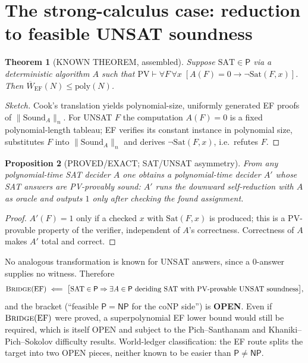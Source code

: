 \documentclass[11pt]{article}
\newtheorem{theorem}{Theorem}
\newtheorem{proposition}[theorem]{Proposition}
\newcommand{\SAT}{\mathrm{SAT}}
\newcommand{\Pclass}{\mathsf{P}}
\newcommand{\NP}{\mathsf{NP}}
\begin{document}
\section{The strong-calculus case: reduction to feasible UNSAT soundness}
\begin{theorem}[KNOWN THEOREM, assembled]\label{thm:ef}
Suppose $\SAT\in\Pclass$ via a deterministic algorithm $A$ such that
$\mathrm{PV}\vdash\forall F\,\forall x\;[A(F)=0\rightarrow\neg\mathrm{Sat}(F,x)]$.
Then $\overline W_{\mathrm{EF}}(N)\le\mathrm{poly}(N)$.
\end{theorem}
\begin{proof}[Sketch]
Cook's translation yields polynomial-size, uniformly generated EF proofs of
$\|\mathrm{Sound}_A\|_n$. For UNSAT $F$ the computation $A(F)=0$ is a fixed polynomial-length
tableau; EF verifies its constant instance in polynomial size, substitutes $F$ into
$\|\mathrm{Sound}_A\|_n$ and derives $\neg\mathrm{Sat}(F,x)$, i.e.\ refutes $F$.
\end{proof}

\begin{proposition}[PROVED/EXACT; SAT/UNSAT asymmetry]\label{prop:asym}
From any polynomial-time SAT decider $A$ one obtains a polynomial-time decider $A'$ whose
\emph{SAT} answers are PV-provably sound: $A'$ runs the downward self-reduction with $A$
as oracle and outputs $1$ only after checking the found assignment.
\end{proposition}
\begin{proof}
$A'(F)=1$ only if a checked $x$ with $\mathrm{Sat}(F,x)$ is produced; this is a PV-provable
property of the verifier, independent of $A$'s correctness. Correctness of $A$ makes $A'$
total and correct.
\end{proof}
No analogous transformation is known for UNSAT answers, since a 0-answer supplies no
witness. Therefore
\[
\textsc{Bridge}(\mathrm{EF})\ \Longleftarrow\
\bigl[\SAT\in\Pclass\Rightarrow\exists A\in\Pclass\text{ deciding }\SAT\text{ with PV-provable UNSAT soundness}\bigr],
\]
and the bracket (``feasible $\Pclass=\NP$ for the coNP side'') is \textbf{OPEN}. Even if
$\textsc{Bridge}(\mathrm{EF})$ were proved, a superpolynomial EF lower bound would still be
required, which is itself OPEN and subject to the Pich--Santhanam and
Khaniki--Pich--Sokolov difficulty results. World-ledger classification: the EF route
splits the target into two OPEN pieces, neither known to be easier than $\Pclass\neq\NP$.
\end{document}
